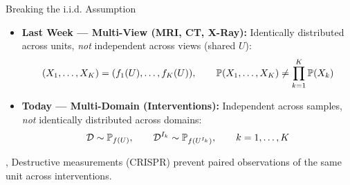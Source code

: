 
\begin{frame}{Breaking the i.i.d. Assumption}
  \vspace{2ex}
  \begin{itemize}
    \item \textbf{Last Week --- Multi-View (MRI, CT, X-Ray):} Identically distributed across units, \emph{not} independent across views (shared $U$):
      \[
        (X_1,\dots,X_K) = (f_1(U),\dots,f_K(U)), \qquad
        \mathbb{P}(X_1,\dots,X_K) \neq \prod_{k=1}^K \mathbb{P}(X_k)
      \]
    \item \textbf{Today --- Multi-Domain (Interventions):} Independent across samples, \emph{not} identically distributed across domains:
      \[
        \mathcal{D} \sim \mathbb{P}_{f(U)}, \qquad \mathcal{D}^{I_k} \sim \mathbb{P}_{f(U^{I_k})}, \qquad k = 1,\dots,K
      \]
  \end{itemize}
  \sep
   Destructive measurements (CRISPR) prevent paired observations of the same unit across interventions.
\end{frame}

